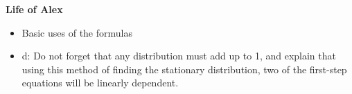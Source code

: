 \item \textbf{Life of Alex}
\begin{itemize}
\item Basic uses of the formulas
\item d: Do not forget that any distribution must add up to 1, and explain that using this method of finding the stationary distribution, two of the first-step equations will be linearly dependent.
\end{itemize}